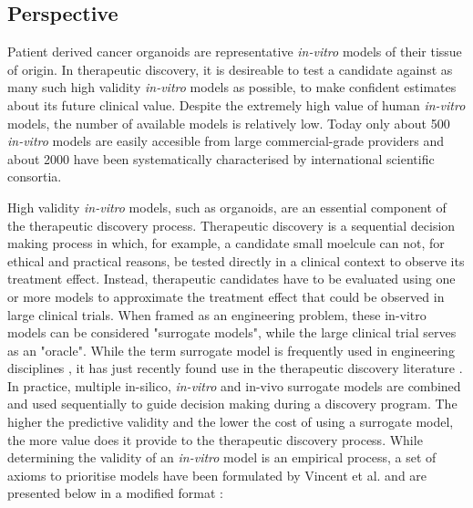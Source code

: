 \begin{flushleft}
\section{Perspective}

Patient derived cancer organoids are representative \textit{in-vitro} models of their tissue of origin. In therapeutic discovery, it is desireable to test a candidate against as many such high validity \textit{in-vitro} models as possible, to make confident estimates about its future clinical value. Despite the extremely high value of human \textit{in-vitro} models, the number of available models is relatively low. Today only about 500 \textit{in-vitro} models are easily accesible from large commercial-grade providers and about 2000 have been systematically characterised by international scientific consortia. 

High validity \textit{in-vitro} models, such as organoids, are an essential component of the therapeutic discovery process. Therapeutic discovery is a sequential decision making process in which, for example, a candidate small moelcule can not, for ethical and practical reasons, be tested directly in a clinical context to observe its treatment effect. Instead, therapeutic candidates have to be evaluated using one or more models to approximate the treatment effect that could be observed in large clinical trials. When framed as an engineering problem, these in-vitro models can be considered "surrogate models", while the large clinical trial serves as an "oracle". While the term surrogate model is frequently used in engineering disciplines \citep{cozadLearningSurrogateModels2014}, it has just recently found use in the therapeutic discovery literature \citep{clydeProteinLigandDockingSurrogate2021}. In practice, multiple in-silico, \textit{in-vitro} and in-vivo surrogate models are combined and used sequentially to guide decision making during a discovery program. The higher the predictive validity and the lower the cost of using a surrogate model, the more value does it provide to the therapeutic discovery process. While determining the validity of an \textit{in-vitro} model is an empirical process, a set of axioms to prioritise models have been formulated by Vincent et al. and are presented below in a modified format \citep{vincentDevelopingPredictiveAssays2015} : 


\end{flushleft}
